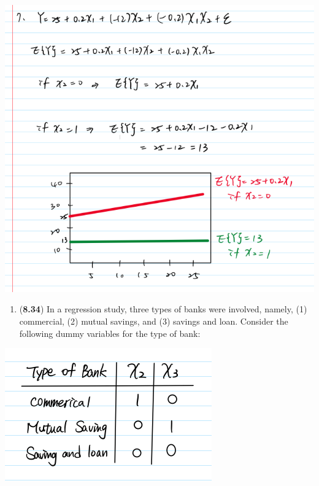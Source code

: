 \documentclass[
]{article}
\providecommand{\tightlist}{%
  \setlength{\itemsep}{0pt}\setlength{\parskip}{0pt}}
\begin{document}
\includegraphics{pics/7.png}

\begin{enumerate}
\def\labelenumi{\arabic{enumi}.}
\setcounter{enumi}{7}
\tightlist
\item
  (\textbf{8.34}) In a regression study, three types of banks were
  involved, namely, (1) commercial, (2) mutual savings, and (3) savings
  and loan. Consider the following dummy variables for the type of bank:
\end{enumerate}

\includegraphics{pics/8.png}
\end{document}
